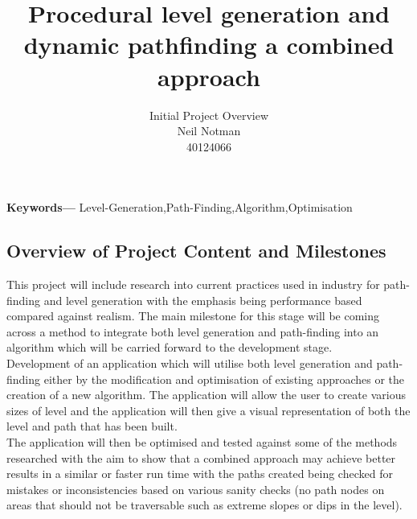 



\pagestyle{fancy}

\cfoot{}
\rfoot{\thepage}
\title{Procedural level generation and dynamic pathfinding a combined approach}
\author{Initial Project Overview\\Neil Notman\\40124066}
\providecommand{\keywords}[1]{\textbf{Keywords---} #1}
\date{}

\sloppy



\renewenvironment{abstract}
  {\small\quotation
  {\bfseries\noindent{\large\abstractname\\\noindent{}}}}
  {\endquotation}


\setlength\parindent{0cm}


\keywords{Level-Generation,Path-Finding,Algorithm,Optimisation}

\subsection{Overview of  Project Content and Milestones}
This project will include research into current practices used in industry for path-finding and level generation with the emphasis being performance based compared against realism. The main milestone for this stage will be coming across a method to integrate both level generation and path-finding into an algorithm which will be carried forward to the development stage.\\

Development of an application which will utilise both level generation and path-finding either by the modification and optimisation of existing approaches or the creation of a new algorithm. The application will allow the user to create various sizes of level and the application will then give a visual representation of both the level and path that has been built.\\

The application will then be optimised and tested against some of the methods researched with the aim to show that a combined approach may achieve better results in a similar or faster run time with the paths created being checked for mistakes or inconsistencies based on various sanity checks (no path nodes on areas that should not be traversable such as extreme slopes or dips in the level).\\

